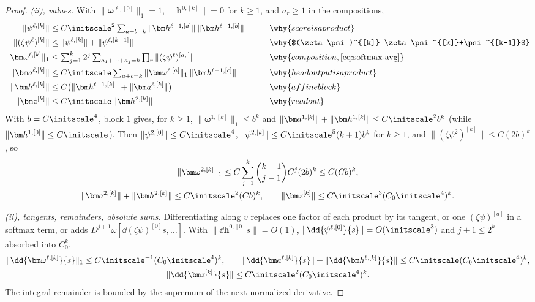 \begin{proof}
\emph{(ii), values.} With $\|\bm\omega^{\ell,[0]}\|_1=1$, $\|\bm h^{0,[k]}\|=0$ for $k\ge1$, and $a_r\ge1$ in the compositions,
\begin{alignat*}{2}
 \|\psi^{\ell,[k]}\|&\le C\initscale^2\textstyle\sum_{a+b=k}\|\bm h^{\ell-1,[a]}\|\,\|\bm h^{\ell-1,[b]}\| &\qquad& \why{score is a product}\\
 \|(\zeta\psi^\ell)^{[k]}\|&\le\|\psi^{\ell,[k]}\|+\|\psi^{\ell,[k-1]}\| && \why{$(\zeta\psi)^{[k]}=\zeta\psi^{[k]}+\psi^{[k-1]}$}\\
 \|\bm\omega^{\ell,[k]}\|_1&\le\textstyle\sum_{j=1}^k2^j\sum_{a_1+\cdots+a_j=k}\prod_r\|(\zeta\psi^\ell)^{[a_r]}\| && \why{composition, \cref{eq:softmax-avg}}\\
 \|\bm a^{\ell,[k]}\|&\le C\initscale\textstyle\sum_{a+c=k}\|\bm\omega^{\ell,[a]}\|_1\,\|\bm h^{\ell-1,[c]}\| && \why{head output is a product}\\
 \|\bm h^{\ell,[k]}\|&\le C\bigl(\|\bm h^{\ell-1,[k]}\|+\|\bm a^{\ell,[k]}\|\bigr) && \why{affine block}\\
 \|\bm z^{[k]}\|&\le C\initscale\,\|\bm h^{2,[k]}\| && \why{readout}
\end{alignat*}
With $b=C\initscale^4$, block $1$ gives, for $k\ge1$, $\|\bm\omega^{1,[k]}\|_1\le b^k$ and $\|\bm a^{1,[k]}\|+\|\bm h^{1,[k]}\|\le C\initscale^2b^k$ (while $\|\bm h^{1,[0]}\|\le C\initscale$). Then $\|\psi^{2,[0]}\|\le C\initscale^4$,
$\|\psi^{2,[k]}\|\le C\initscale^5(k+1)b^k$ for $k\ge1$, and $\|(\zeta\psi^2)^{[k]}\|\le C(2b)^k$, so
\begin{gather*}
 \|\bm\omega^{2,[k]}\|_1\le C\sum_{j=1}^k\binom{k-1}{j-1}C^j(2b)^k\le C(Cb)^k,\\
 \|\bm a^{2,[k]}\|+\|\bm h^{2,[k]}\|\le C\initscale^2(Cb)^k,\qquad \|\bm z^{[k]}\|\le C\initscale^3(C_0\initscale^4)^k .
\end{gather*}

\emph{(ii), tangents, remainders, absolute sums.} Differentiating along $v$ replaces one factor of each product by its tangent, or one
$(\zeta\psi)^{[a]}$ in a softmax term, or adds $D^{j+1}\omega[\dd{(\zeta\psi)^{[0]}}{s},\ldots]$. With $\|\dd{\bm h^{0,[0]}}{s}\|=O(1)$, $\|\dd{\psi^{\ell,[0]}}{s}\|=O(\initscale^3)$
and $j+1\le2^k$ absorbed into $C_0^k$,
\begin{gather*}
 \|\dd{\bm\omega^{\ell,[k]}}{s}\|_1\le C\initscale^{-1}(C_0\initscale^4)^k,\qquad \|\dd{\bm a^{\ell,[k]}}{s}\|+\|\dd{\bm h^{\ell,[k]}}{s}\|\le C\initscale(C_0\initscale^4)^k,\\
 \|\dd{\bm z^{[k]}}{s}\|\le C\initscale^2(C_0\initscale^4)^k .
\end{gather*}
The integral remainder is bounded by the supremum of the next normalized derivative.


\end{proof}
